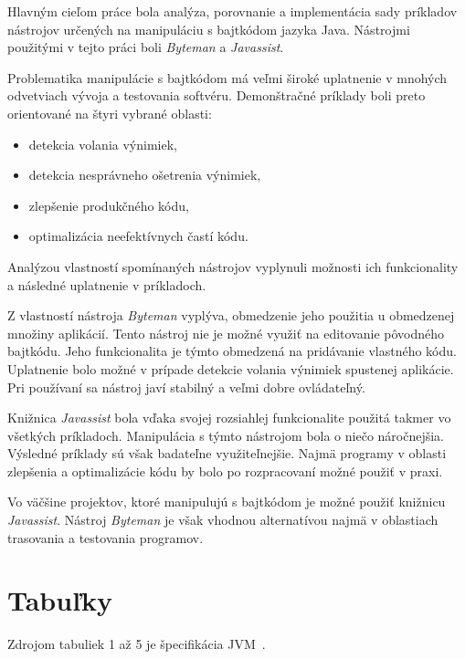 \documentclass[11pt,final,oneside]{fithesis}
\begin{document}
Hlavným cieľom práce bola analýza, porovnanie a implementácia sady príkladov
nástrojov určených na manipuláciu s bajtkódom jazyka Java. Nástrojmi použitými
v tejto práci boli \textit{Byteman} a \textit{Javassist}. 

Problematika manipulácie s bajtkódom má veľmi široké uplatnenie v mnohých
odvetviach vývoja a testovania softvéru. Demonštračné príklady boli preto
orientované na štyri vybrané oblasti:

\begin{itemize}
\item detekcia volania výnimiek,
\item detekcia nesprávneho ošetrenia výnimiek,
\item zlepšenie produkčného kódu,
\item optimalizácia neefektívnych častí kódu.
\end{itemize}

Analýzou vlastností spomínaných nástrojov vyplynuli možnosti ich funkcionality
a následné uplatnenie v príkladoch. 

Z vlastností nástroja \textit{Byteman} vyplýva, obmedzenie jeho použitia u
obmedzenej množiny aplikácií. Tento nástroj nie je možné využiť na 
editovanie pôvodného bajtkódu. Jeho funkcionalita je týmto obmedzená
na pridávanie vlastného kódu. Uplatnenie bolo možné v prípade
detekcie volania výnimiek spustenej aplikácie. Pri používaní sa nástroj javí
stabilný a veľmi dobre ovládateľný.

Knižnica \textit{Javassist} bola vďaka svojej rozsiahlej funkcionalite použitá
takmer vo všetkých príkladoch. Manipulácia s týmto nástrojom bola o niečo
náročnejšia. Výsledné príklady sú však badateľne využiteľnejšie. Najmä
programy v oblasti zlepšenia a optimalizácie kódu by bolo po rozpracovaní možné
použiť v praxi.

Vo väčšine projektov, ktoré manipulujú s bajtkódom je možné použiť knižnicu
\textit{Javassist}. Nástroj \textit{Byteman} je však vhodnou alternatívou najmä
v oblastiach trasovania a testovania programov.

\nocite{RedHat:Javassist}
\clearpage
{} 
 
 

\appendix

\chapter{Tabuľky}

Zdrojom tabuliek 1 až 5 je špecifikácia
JVM~\cite{Lindholm:2013:JVM:2462629}.
\end{document}
